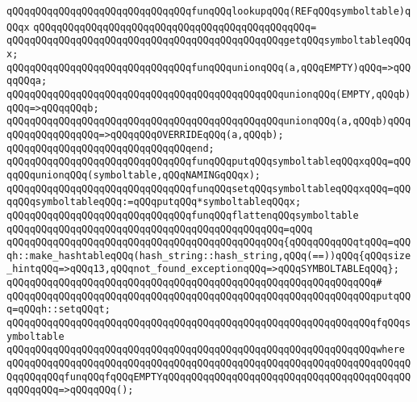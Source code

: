 \verb|qQQqqQQqqQQqqQQqqQQqqQQqqQQqqQQqfunqQQqlookupqQQq(REFqQQqsymboltable)qQQqx|\newline
\verb|qQQqqQQqqQQqqQQqqQQqqQQqqQQqqQQqqQQqqQQqqQQqqQQq=|\newline
\verb|qQQqqQQqqQQqqQQqqQQqqQQqqQQqqQQqqQQqqQQqqQQqqQQqgetqQQqsymboltableqQQqx;|\newline
\newline
\verb|qQQqqQQqqQQqqQQqqQQqqQQqqQQqqQQqfunqQQqunionqQQq(a,qQQqEMPTY)qQQq=>qQQqqQQqa;|\newline
\verb|qQQqqQQqqQQqqQQqqQQqqQQqqQQqqQQqqQQqqQQqqQQqqQQqunionqQQq(EMPTY,qQQqb)qQQq=>qQQqqQQqb;|\newline
\verb|qQQqqQQqqQQqqQQqqQQqqQQqqQQqqQQqqQQqqQQqqQQqqQQqunionqQQq(a,qQQqb)qQQqqQQqqQQqqQQqqQQq=>qQQqqQQqOVERRIDEqQQq(a,qQQqb);|\newline
\verb|qQQqqQQqqQQqqQQqqQQqqQQqqQQqqQQqend;|\newline
\newline
\verb|qQQqqQQqqQQqqQQqqQQqqQQqqQQqqQQqfunqQQqputqQQqsymboltableqQQqxqQQq=qQQqqQQqunionqQQq(symboltable,qQQqNAMINGqQQqx);|\newline
\verb|qQQqqQQqqQQqqQQqqQQqqQQqqQQqqQQqfunqQQqsetqQQqsymboltableqQQqxqQQq=qQQqqQQqsymboltableqQQq:=qQQqputqQQq*symboltableqQQqx;|\newline
\newline
\verb|qQQqqQQqqQQqqQQqqQQqqQQqqQQqqQQqfunqQQqflattenqQQqsymboltable|\newline
\verb|qQQqqQQqqQQqqQQqqQQqqQQqqQQqqQQqqQQqqQQqqQQqqQQq=qQQq|\newline
\verb|qQQqqQQqqQQqqQQqqQQqqQQqqQQqqQQqqQQqqQQqqQQqqQQq{qQQqqQQqqQQqtqQQq=qQQqh::make_hashtableqQQq(hash_string::hash_string,qQQq(==))qQQq{qQQqsize_hintqQQq=>qQQq13,qQQqnot_found_exceptionqQQq=>qQQqSYMBOLTABLEqQQq};|\newline
\verb|qQQqqQQqqQQqqQQqqQQqqQQqqQQqqQQqqQQqqQQqqQQqqQQqqQQqqQQqqQQqqQQq#|\newline
\verb|qQQqqQQqqQQqqQQqqQQqqQQqqQQqqQQqqQQqqQQqqQQqqQQqqQQqqQQqqQQqqQQqputqQQq=qQQqh::setqQQqt;|\newline
\newline
\verb|qQQqqQQqqQQqqQQqqQQqqQQqqQQqqQQqqQQqqQQqqQQqqQQqqQQqqQQqqQQqqQQqfqQQqsymboltable|\newline
\verb|qQQqqQQqqQQqqQQqqQQqqQQqqQQqqQQqqQQqqQQqqQQqqQQqqQQqqQQqqQQqqQQqwhere|\newline
\verb|qQQqqQQqqQQqqQQqqQQqqQQqqQQqqQQqqQQqqQQqqQQqqQQqqQQqqQQqqQQqqQQqqQQqqQQqqQQqqQQqfunqQQqfqQQqEMPTYqQQqqQQqqQQqqQQqqQQqqQQqqQQqqQQqqQQqqQQqqQQqqQQqqQQq=>qQQqqQQq();|\newline

